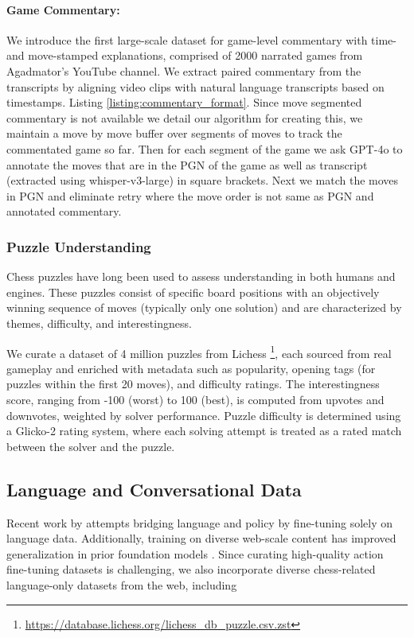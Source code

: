 \documentclass{article}
\theoremstyle{plain}
\theoremstyle{definition}
\theoremstyle{remark}
\begin{document}
\paragraph{Game Commentary:} We introduce the first large-scale dataset for game-level commentary with time- and move-stamped explanations, comprised of 2000 narrated games from Agadmator’s YouTube channel. We extract paired commentary from the transcripts by aligning video clips with natural language transcripts based on timestamps. Listing \ref{listing:commentary_format}. Since move segmented commentary is not available we detail our algorithm for creating this, we maintain a move by move buffer over segments of moves to track the commentated game so far. Then for each segment of the game we ask GPT-4o to annotate the moves that are in the PGN of the game as well as transcript (extracted using whisper-v3-large) in square brackets. Next we match the moves in PGN and eliminate retry where the move order is not same as PGN and annotated commentary. 

\subsubsection{Puzzle Understanding}
Chess puzzles have long been used to assess understanding in both humans and engines. These puzzles consist of specific board positions with an objectively winning sequence of moves (typically only one solution) and are characterized by themes, difficulty, and interestingness.

We curate a dataset of 4 million puzzles from Lichess \footnote{\url{https://database.lichess.org/lichess_db_puzzle.csv.zst}}, each sourced from real gameplay and enriched with metadata such as popularity, opening tags (for puzzles within the first 20 moves), and difficulty ratings. The interestingness score, ranging from -100 (worst) to 100 (best), is computed from upvotes and downvotes, weighted by solver performance. Puzzle difficulty is determined using a Glicko-2 rating system, where each solving attempt is treated as a rated match between the solver and the puzzle. 

\subsection{Language and Conversational Data}
Recent work by \citet{feng2024chessgpt} attempts bridging language and policy by fine-tuning solely on language data. Additionally, training on diverse web-scale content has improved generalization in prior foundation models \cite{liu2024improved}. Since curating high-quality action fine-tuning datasets is challenging, we also incorporate diverse chess-related language-only datasets from the web, including
\end{document}
